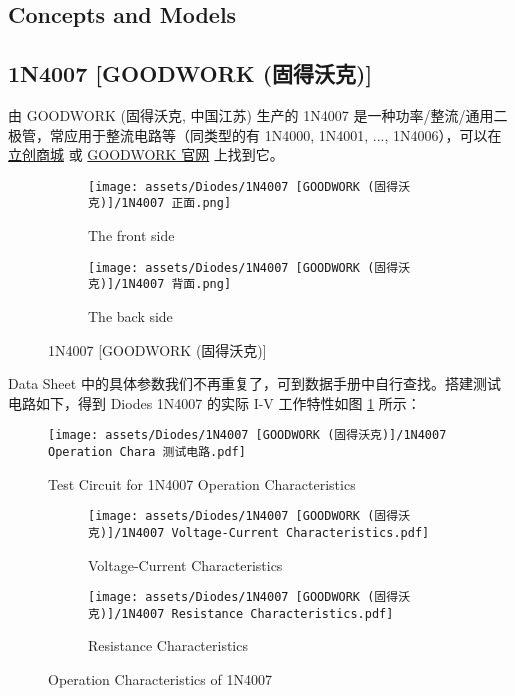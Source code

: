 \documentclass[UTF8]{report}
\begin{document}
\subsection{Concepts and Models}



\subsection{1N4007 [GOODWORK (固得沃克)]}
由 GOODWORK (固得沃克, 中国江苏) 生产的 1N4007 是一种功率/整流/通用二极管，常应用于整流电路等（同类型的有 1N4000, 1N4001, ..., 1N4006），可以在 \href{https://item.szlcsc.com/3428711.html}{立创商城} 或 \href{http://www.gk-goodwork.com/cn/product/1n4007.html}{GOODWORK 官网} 上找到它。
\begin{figure}[H]\centering
\begin{subfigure}[b]{0.5\columnwidth}\centering
    \texttt{[image: assets/Diodes/1N4007 [GOODWORK (固得沃克)]/1N4007 正面.png]}
    \caption{The front side}
\end{subfigure}\hfill
\begin{subfigure}[b]{0.5\columnwidth}\centering
    \texttt{[image: assets/Diodes/1N4007 [GOODWORK (固得沃克)]/1N4007 背面.png]}
    \caption{The back side}
\end{subfigure}
\caption{1N4007 [GOODWORK (固得沃克)]}
\end{figure}

Data Sheet 中的具体参数我们不再重复了，可到数据手册中自行查找。搭建测试电路如下，得到 Diodes 1N4007 的实际 I-V 工作特性如图 \ref{Operation Characteristics of 1N4007} 所示：
\begin{figure}[H]\centering
    \texttt{[image: assets/Diodes/1N4007 [GOODWORK (固得沃克)]/1N4007 Operation Chara 测试电路.pdf]}
    \caption{Test Circuit for 1N4007 Operation Characteristics}
\end{figure}

\begin{figure}[H]\centering
\begin{subfigure}[b]{0.5\columnwidth}\centering
    \texttt{[image: assets/Diodes/1N4007 [GOODWORK (固得沃克)]/1N4007 Voltage-Current Characteristics.pdf]}
    \caption{Voltage-Current Characteristics}
\end{subfigure}\hfill
\begin{subfigure}[b]{0.5\columnwidth}\centering
    \texttt{[image: assets/Diodes/1N4007 [GOODWORK (固得沃克)]/1N4007 Resistance Characteristics.pdf]}
    \caption{Resistance Characteristics}
\end{subfigure}
\caption{Operation Characteristics of 1N4007}
\label{Operation Characteristics of 1N4007}
\end{figure}
\end{document}
